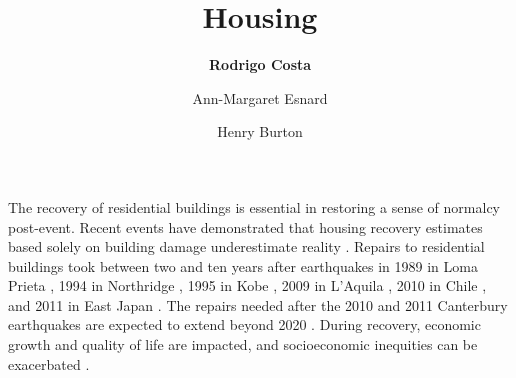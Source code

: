 %
%
%


%
%
%
%
%
%
%
%

\title{Housing}
\author{
    \textbf{Rodrigo Costa}
    \and{Ann-Margaret Esnard}
    \and{Henry Burton}}
\tocauthor{}
%
%
\maketitle

The recovery of residential buildings is essential in restoring a sense of normalcy post-event. Recent events have demonstrated that housing recovery estimates based solely on building damage underestimate reality \citep{comerio2006estimating}. Repairs to residential buildings took between two and ten years after earthquakes in 1989 in Loma Prieta \citep{comerio2006estimating}, 1994 in Northridge \citep{Olshansky2006}, 1995 in Kobe \citep{comerio2014disaster, Olshansky2006}, 2009 in L'Aquila \citep{di2017reconstruction1, di2017reconstruction2}, 2010 in Chile \citep{comerio2013housing}, and 2011 in East Japan \citep{ranghieri2014learning}. The repairs needed after the 2010 and 2011 Canterbury earthquakes are expected to extend beyond 2020 \citep{BankOfNZ2016}. During recovery, economic growth and quality of life are impacted, and socioeconomic inequities can be exacerbated \citep{peacock2014inequities, wang2015influencing, bolin1985disasters}.\

